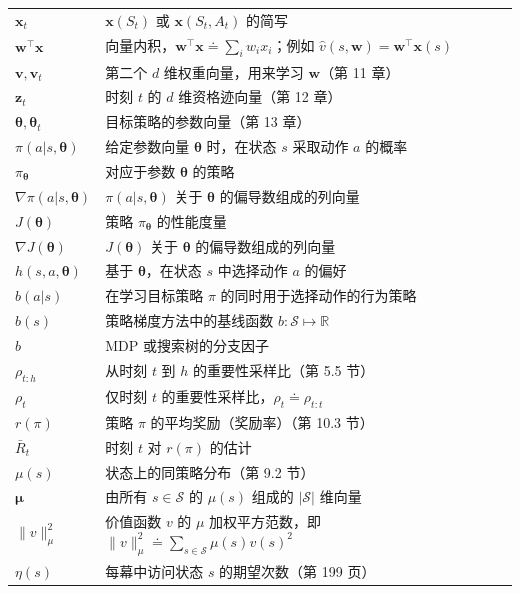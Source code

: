 \documentclass[UTF8,12pt,a4paper,fontset=fandol]{ctexart}
\begin{document}
\begin{longtable}{p{}p{}}
$\mathbf{x}_t$ & $\mathbf{x}(S_t)$ 或 $\mathbf{x}(S_t,A_t)$ 的简写 \\
$\mathbf{w}^\top\mathbf{x}$ & 向量内积，$\mathbf{w}^\top\mathbf{x}\doteq\sum_i w_i x_i$；例如 $\hat v(s,\mathbf{w})=\mathbf{w}^\top\mathbf{x}(s)$ \\
$\mathbf{v},\mathbf{v}_t$ & 第二个 $d$ 维权重向量，用来学习 $\mathbf{w}$（第 11 章） \\
$\mathbf{z}_t$ & 时刻 $t$ 的 $d$ 维资格迹向量（第 12 章） \\
$\boldsymbol{\theta},\boldsymbol{\theta}_t$ & 目标策略的参数向量（第 13 章） \\
$\pi(a|s,\boldsymbol{\theta})$ & 给定参数向量 $\boldsymbol{\theta}$ 时，在状态 $s$ 采取动作 $a$ 的概率 \\
$\pi_{\boldsymbol{\theta}}$ & 对应于参数 $\boldsymbol{\theta}$ 的策略 \\
$\nabla\pi(a|s,\boldsymbol{\theta})$ & $\pi(a|s,\boldsymbol{\theta})$ 关于 $\boldsymbol{\theta}$ 的偏导数组成的列向量 \\
$J(\boldsymbol{\theta})$ & 策略 $\pi_{\boldsymbol{\theta}}$ 的性能度量 \\
$\nabla J(\boldsymbol{\theta})$ & $J(\boldsymbol{\theta})$ 关于 $\boldsymbol{\theta}$ 的偏导数组成的列向量 \\
$h(s,a,\boldsymbol{\theta})$ & 基于 $\boldsymbol{\theta}$，在状态 $s$ 中选择动作 $a$ 的偏好 \\
$b(a|s)$ & 在学习目标策略 $\pi$ 的同时用于选择动作的行为策略 \\
$b(s)$ & 策略梯度方法中的基线函数 $b:\mathcal{S}\mapsto\mathbb{R}$ \\
$b$ & MDP 或搜索树的分支因子 \\
$\rho_{t:h}$ & 从时刻 $t$ 到 $h$ 的重要性采样比（第 5.5 节） \\
$\rho_t$ & 仅时刻 $t$ 的重要性采样比，$\rho_t\doteq\rho_{t:t}$ \\
$r(\pi)$ & 策略 $\pi$ 的平均奖励（奖励率）（第 10.3 节） \\
$\bar R_t$ & 时刻 $t$ 对 $r(\pi)$ 的估计 \\
$\mu(s)$ & 状态上的同策略分布（第 9.2 节） \\
$\boldsymbol{\mu}$ & 由所有 $s\in\mathcal{S}$ 的 $\mu(s)$ 组成的 $|\mathcal{S}|$ 维向量 \\
$\|v\|_\mu^2$ & 价值函数 $v$ 的 $\mu$ 加权平方范数，即 $\|v\|_\mu^2\doteq\sum_{s\in\mathcal{S}}\mu(s)v(s)^2$ \\
$\eta(s)$ & 每幕中访问状态 $s$ 的期望次数（第 199 页） \\

\end{longtable}
\end{document}
